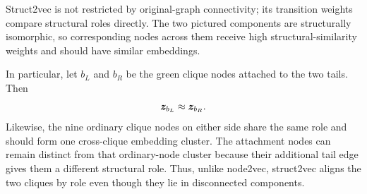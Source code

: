 \begin{solution}
Struct2vec is not restricted by original-graph connectivity; its transition
weights compare structural roles directly.  The two pictured components are
structurally isomorphic, so corresponding nodes across them receive high
structural-similarity weights and should have similar embeddings.

In particular, let \(b_L\) and \(b_R\) be the green clique nodes attached to
the two tails.  Then
\[
  \bm{z}_{b_L}\approx\bm{z}_{b_R}.
\]
Likewise, the nine ordinary clique nodes on either side share the same role
and should form one cross-clique embedding cluster.  The attachment nodes can
remain distinct from that ordinary-node cluster because their additional tail
edge gives them a different structural role.  Thus, unlike node2vec,
struct2vec aligns the two cliques by role even though they lie in disconnected
components.
\end{solution}

